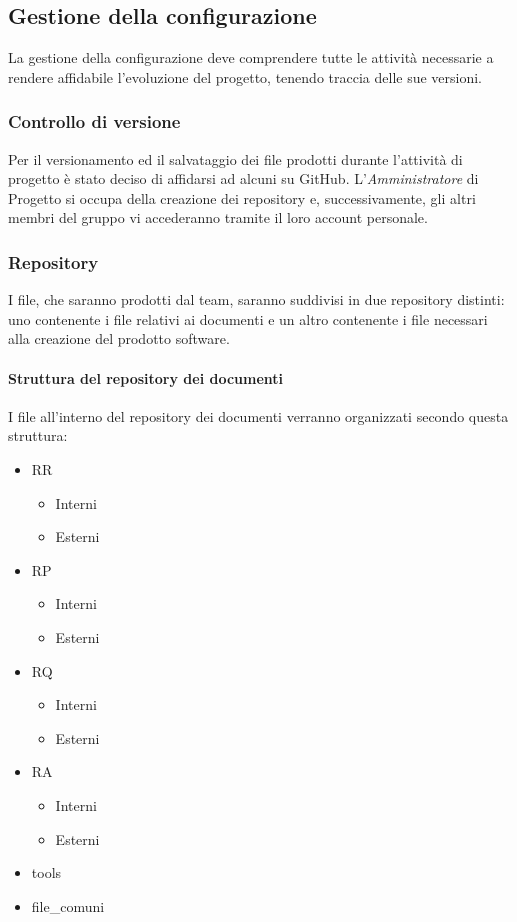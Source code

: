 \subsection{Gestione della configurazione}
La gestione della configurazione deve comprendere tutte le attività necessarie a rendere
affidabile l'evoluzione del progetto, tenendo traccia delle sue versioni.

\subsubsection{Controllo di versione}

Per il versionamento ed il salvataggio dei file prodotti durante l'attività di progetto è stato deciso di affidarsi ad alcuni  su GitHub. L'\emph{Amministratore}  di Progetto si occupa della creazione dei repository e, successivamente, gli altri membri del gruppo vi accederanno tramite il loro account personale.


\subsubsection{Repository}

I file, che saranno prodotti dal team, saranno suddivisi in due repository distinti: uno contenente i file relativi ai documenti e un altro contenente i file necessari alla creazione del prodotto software.

\paragraph{Struttura del repository dei documenti} 
I file all'interno del repository dei documenti verranno organizzati secondo questa struttura:

\begin{itemize}
	\item RR
	\begin{itemize}
		\item Interni
		\item Esterni
	\end{itemize}
	\item RP
	\begin{itemize}
		\item Interni
		\item Esterni
	\end{itemize}
	\item RQ
	\begin{itemize}
		\item Interni
		\item Esterni
	\end{itemize}
	\item RA
	\begin{itemize}
		\item Interni
		\item Esterni
	\end{itemize}
	\item tools
	\item file\_comuni
\end{itemize}

